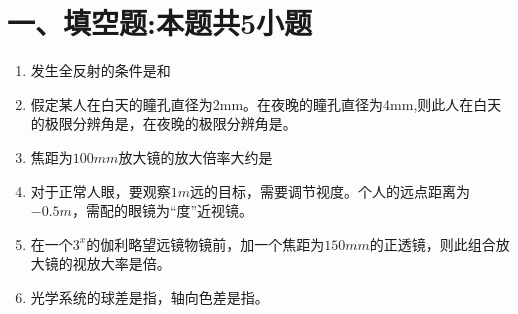 \documentclass[11pt,a4paper]{article}
\begin{document}
    \section*{一、填空题:本题共5小题}
    \begin{enumerate}
        \vspace{0mm}
        \item 发生全反射的条件是\underline{\makebox[2cm]{}}和\underline{\makebox[2cm]{}}
        \vspace{-3mm}
        \item 假定某人在白天的瞳孔直径为2mm。在夜晚的瞳孔直径为4mm,则此人在白天的极限分辨角是\underline{\makebox[2cm]{}}，在夜晚的极限分辨角是\underline{\makebox[2cm]{}}。
        \vspace{-3mm}
        \item 焦距为$100mm$放大镜的放大倍率大约是\underline{\makebox[3cm]{}}        
        \vspace{-3mm}
        \item 对于正常人眼，要观察$1m$远的目标，需要调节\underline{\makebox[2cm]{}}视度。个人的远点距离为$-0.5m$，需配的眼镜为\underline{\makebox[2cm]{}}“度”近视镜。
        \vspace{-3mm}
        \item 在一个$3^x$的伽利略望远镜物镜前，加一个焦距为$150mm$的正透镜，则此组合放大镜的视放大率是\underline{\makebox[2cm]{}}倍。
        \vspace{-3mm}
        \item 光学系统的球差是指\underline{\makebox[3cm]{}}，轴向色差是指\underline{\makebox[3cm]{}}。
        \vspace{-3mm}
    \end{enumerate}
\end{document}
